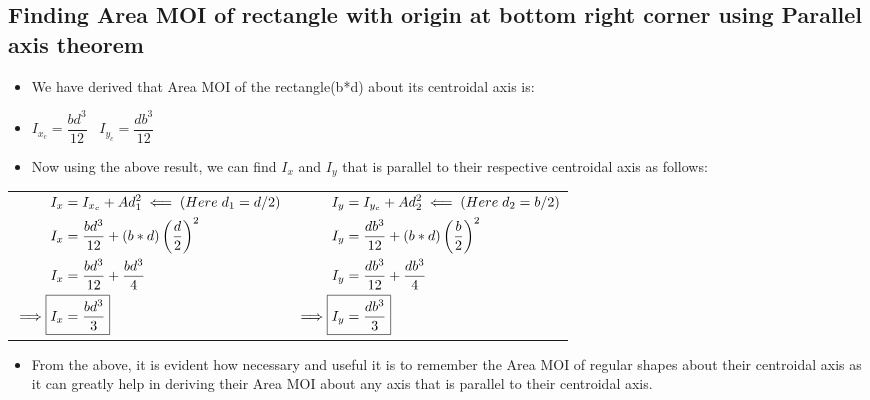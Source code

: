 \documentclass[8pt]{report}
\begin{document}
	\subsection{Finding Area MOI of rectangle with origin at bottom right corner using Parallel axis theorem}
		\begin{itemize}
			\item We have derived that Area MOI of the rectangle(b*d) about its centroidal axis is:
			\item $\boxed{I_{x_c} = \dfrac{bd^3}{12}}\;\;\;\boxed{I_{y_c} = \dfrac{db^3}{12}}$
			\item Now using the above result, we can find $I_x$ and $I_y$ that is parallel to their respective centroidal axis as follows:
		\end{itemize}
		\begin{table}[H]
			\centering
			\begin{tabular}{c|c}
				${\begin{aligned}
				I_x &= I_{x_c} + Ad_1^2 \impliedby (Here\;d_1=d/2)\\
				I_x &= \dfrac{bd^3}{12} + (b*d)\left(\dfrac{d}{2}\right)^2\\
				I_x &= \dfrac{bd^3}{12} + \dfrac{bd^3}{4}\\
				\implies \Aboxed{I_x &= \dfrac{bd^3}{3}}		
				\end{aligned}}$
				&
				${\begin{aligned}
				I_y &= I_{y_c} + Ad_2^2 \impliedby (Here\;d_2=b/2)\\
				I_y &= \dfrac{db^3}{12} + (b*d)\left(\dfrac{b}{2}\right)^2\\
				I_y &= \dfrac{db^3}{12} + \dfrac{db^3}{4}\\
				\implies \Aboxed{I_y &= \dfrac{db^3}{3}}
				\end{aligned}}$
			\end{tabular}
		\end{table}
		\begin{itemize}
			\item From the above, it is evident how necessary and useful it is to remember the Area MOI of regular shapes about their centroidal axis as it can greatly help in deriving their Area MOI about any axis that is parallel to their centroidal axis. 
		\end{itemize}\hrulefill
\end{document}
